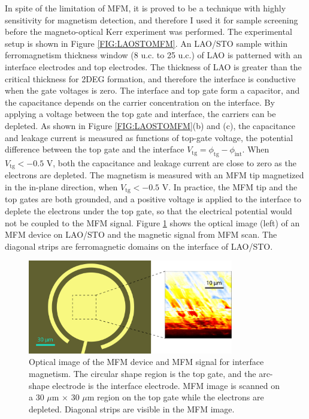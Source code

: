\documentclass[pdflatex, sectionletters, 12pt]{pittetd}    %
\begin{document}
In spite of the limitation of MFM, it is proved to be a technique with highly sensitivity\cite{bi2014room} for magnetism detection, and therefore I used it for sample screening before the magneto-optical Kerr experiment was performed. The experimental setup is shown in Figure \ref{FIG:LAOSTOMFM}. An LAO/STO sample within ferromagnetism  thickness window (8 u.c. to 25 u.c.) of LAO\cite{bi2015laalo3} is patterned with an interface electrodes and top electrodes. The thickness of LAO is greater than the critical thickness for 2DEG formation, and therefore the interface is conductive when the gate voltages is zero. The interface and top gate form a capacitor, and the capacitance depends on the carrier concentration on the interface. By applying a voltage between the top gate and interface, the carriers can be depleted. As shown in Figure \ref{FIG:LAOSTOMFM}(b) and (c), the capacitance and leakage current is measured as functions of top-gate voltage, the potential difference between the top gate and the interface $V_\mathrm{tg} = \phi_\mathrm{tg} - \phi_\mathrm{int}$. When $V_\mathrm{tg} < -0.5$ V, both the capacitance and leakage current are close to zero as the electrons are depleted. The magnetism is measured with an MFM tip magnetized in the in-plane direction, when $V_\mathrm{tg} < -0.5$ V. In practice, the MFM tip and the top gates are both grounded, and a positive voltage is applied to the interface to deplete the electrons under the top gate, so that the electrical potential would not be coupled to the MFM signal. Figure \ref{FIG:MFMSignal} shows the optical image (left) of an MFM device on LAO/STO and the magnetic signal from MFM scan. The diagonal strips are ferromagnetic domains on the interface of LAO/STO.
\\

\begin{figure}[h!]
	\centering
	\includegraphics[width=0.8\textwidth]{Drawing/MFMSignal.pdf}
	\caption{Optical image of the MFM device and MFM signal for interface magnetism. The circular shape region is the top gate, and the arc-shape electrode is the interface electrode. MFM image is scanned on a 30 $\mu$m $
		\times$ 30 $\mu$m region on the top gate while the electrons are depleted. Diagonal strips are visible in the MFM image.}
	\label{FIG:MFMSignal}
\end{figure}
\end{document}
